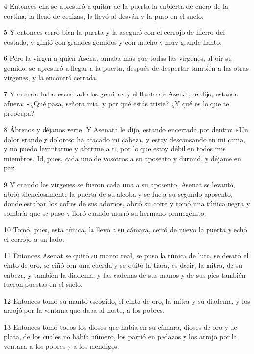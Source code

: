 \par 4 Entonces ella se apresuró a quitar de la puerta la cubierta de cuero de la cortina, la llenó de cenizas, la llevó al desván y la puso en el suelo.

\par 5 Y entonces cerró bien la puerta y la aseguró con el cerrojo de hierro del costado, y gimió con grandes gemidos y con mucho y muy grande llanto.

\par 6 Pero la virgen a quien Asenat amaba más que todas las vírgenes, al oír su gemido, se apresuró a llegar a la puerta, después de despertar también a las otras vírgenes, y la encontró cerrada.

\par 7 Y cuando hubo escuchado los gemidos y el llanto de Asenat, le dijo, estando afuera: «¿Qué pasa, señora mía, y por qué estás triste? ¿Y qué es lo que te preocupa?

\par 8 Ábrenos y déjanos verte. Y Asenath le dijo, estando encerrada por dentro: «Un dolor grande y doloroso ha atacado mi cabeza, y estoy descansando en mi cama, y ​​no puedo levantarme y abrirme a ti, por lo que estoy débil en todos mis miembros. Id, pues, cada uno de vosotros a su aposento y durmid, y déjame en paz.

\par 9 Y cuando las vírgenes se fueron cada una a su aposento, Asenat se levantó, abrió silenciosamente la puerta de su alcoba y se fue a su segundo aposento, donde estaban los cofres de sus adornos, abrió su cofre y tomó una túnica negra y sombría que se puso y lloró cuando murió su hermano primogénito.

\par 10 Tomó, pues, esta túnica, la llevó a su cámara, cerró de nuevo la puerta y echó el cerrojo a un lado.

\par 11 Entonces Asenat se quitó su manto real, se puso la túnica de luto, se desató el cinto de oro, se ciñó con una cuerda y se quitó la tiara, es decir, la mitra, de su cabeza, y también la diadema, y ​​las cadenas de sus manos y de sus pies también fueron puestas en el suelo.

\par 12 Entonces tomó su manto escogido, el cinto de oro, la mitra y su diadema, y ​​los arrojó por la ventana que daba al norte, a los pobres.

\par 13 Entonces tomó todos los dioses que había en su cámara, dioses de oro y de plata, de los cuales no había número, los partió en pedazos y los arrojó por la ventana a los pobres y a los mendigos.

